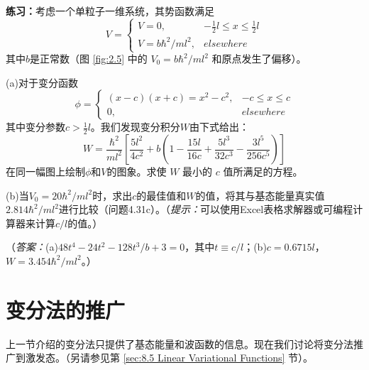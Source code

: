 \begin{examplebox}
        \textbf{练习：}考虑一个单粒子一维系统，其势函数满足
        \begin{equation*}
            V = \begin{cases}
                V = 0, & -\frac{1}{2}l \leq x \leq \frac{1}{2}l \\
                V = b\hbar^2/ml^2, & elsewhere
            \end{cases}
        \end{equation*}
        其中$b$是正常数（图 \ref{fig:2.5} 中的 $V_0 = b\hbar^2/ml^2$ 和原点发生了偏移）。

        (a)对于变分函数
        \begin{equation*}
            \phi = \begin{cases}
                \left(x-c\right)\left(x+c\right) = x^2 - c^2, & -c \leq x \leq c \\
                0, & elsewhere
            \end{cases}
        \end{equation*}
        其中变分参数$c > \frac{1}{2}l$。我们发现变分积分$W$由下式给出：
        \begin{equation*}
            W = \frac{\hbar^2}{ml^2}\left[\frac{5l^2}{4c^2} + b\left(1-\frac{15l}{16c} + \frac{5l^3}{32c^3} - \frac{3l^5}{256c^5}\right)\right]
        \end{equation*}
        在同一幅图上绘制$\phi$和$V$的图象。求使 $W$ 最小的 $c$ 值所满足的方程。

        (b)当$V_0 = 20\hbar^2/ml^2$时，求出$c$的最佳值和$W$的值，将其与基态能量真实值$2.814\hbar^2/ml^2$进行比较（问题4.31c）。（\textit{提示：}可以使用Excel表格求解器或可编程计算器来计算$c/l$的值。）

        （\textit{答案：}(a)$48t^4-24t^2-128t^3/b+3=0$，其中$t \equiv c/l$；(b)$c = 0.6715l$，$W = 3.454\hbar^2/ml^2$。）
    \end{examplebox}

\section{变分法的推广}
\label{sec:8.2 Extension of the Variational Method}
    上一节介绍的变分法只提供了基态能量和波函数的信息。现在我们讨论将变分法推广到激发态。（另请参见第 \ref{sec:8.5 Linear Variational Functions} 节）。

